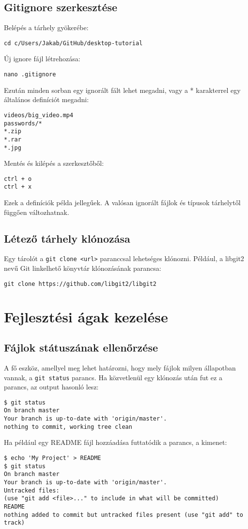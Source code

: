 \documentclass{article}
\begin{document}
\subsection*{Gitignore szerkesztése}
Belépés a tárhely gyökerébe:
\begin{lstlisting}
cd c/Users/Jakab/GitHub/desktop-tutorial
\end{lstlisting}
Új ignore fájl létrehozása:
\begin{lstlisting}
nano .gitignore
\end{lstlisting}
Ezután minden sorban egy ignorált fált lehet megadni, vagy a * karakterrel egy általános definíciót megadni:
\begin{lstlisting}
videos/big_video.mp4
passwords/*
*.zip
*.rar
*.jpg
\end{lstlisting}
Mentés és kilépés a szerkesztőből:
\begin{lstlisting}
ctrl + o
ctrl + x
\end{lstlisting}
Ezek a definíciók példa jellegűek. A valósan ignorált fájlok és típusok tárhelytől függően változhatnak.

\subsection*{Létező tárhely klónozása}
Egy tárolót a \texttt{git clone <url>} paranccsal lehetséges klónozni. Például, a libgit2 nevű Git linkelhető könyvtár klónozásának parancsa:
\begin{lstlisting}
git clone https://github.com/libgit2/libgit2
\end{lstlisting}

\newpage
\section{Fejlesztési ágak kezelése}

\subsection*{Fájlok státuszának ellenőrzése}
A fő eszköz, amellyel meg lehet határozni, hogy mely fájlok milyen állapotban vannak, a \texttt{git status} parancs. Ha közvetlenül egy klónozás után fut ez a parancs, az output hasonló lesz:
\begin{lstlisting}
$ git status
On branch master
Your branch is up-to-date with 'origin/master'.
nothing to commit, working tree clean
\end{lstlisting}
\begin{minipage}{\linewidth}
Ha például egy README fájl hozzáadása futtatódik a parancs, a kimenet:
\begin{lstlisting}
$ echo 'My Project' > README
$ git status
On branch master
Your branch is up-to-date with 'origin/master'.
Untracked files:
(use "git add <file>..." to include in what will be committed)
README
nothing added to commit but untracked files present (use "git add" to track)
\end{lstlisting}
\end{minipage}
\end{document}
